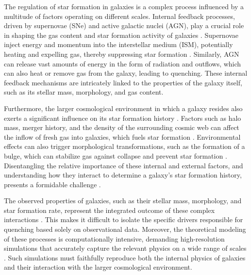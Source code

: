 \documentclass[twocolumn]{aastex631}
\begin{document}
The regulation of star formation in galaxies is a complex process influenced by a multitude of factors operating on different scales. Internal feedback processes, driven by supernovae (SNe) and active galactic nuclei (AGN), play a crucial role in shaping the gas content and star formation activity of galaxies \citep{hopkins2011selfregulatedstarformationgalaxies,carr2022regulationstarformationhot}. Supernovae inject energy and momentum into the interstellar medium (ISM), potentially heating and expelling gas, thereby suppressing star formation \citep{hopkins2011selfregulatedstarformationgalaxies,carr2022regulationstarformationhot}. Similarly, AGN can release vast amounts of energy in the form of radiation and outflows, which can also heat or remove gas from the galaxy, leading to quenching. These internal feedback mechanisms are intricately linked to the properties of the galaxy itself, such as its stellar mass, morphology, and gas content.

Furthermore, the larger cosmological environment in which a galaxy resides also exerts a significant influence on its star formation history \citep{wijesinghe2012galaxymassassemblygama,shi2023naturevsnurturerevisiting,pérezmillán2023relationmorphologystarformation}. Factors such as halo mass, merger history, and the density of the surrounding cosmic web can affect the inflow of fresh gas into galaxies, which fuels star formation \citep{wijesinghe2012galaxymassassemblygama,pérezmillán2023relationmorphologystarformation}. Environmental effects can also trigger morphological transformations, such as the formation of a bulge, which can stabilize gas against collapse and prevent star formation \citep{pérezmillán2023relationmorphologystarformation}. Disentangling the relative importance of these internal and external factors, and understanding how they interact to determine a galaxy's star formation history, presents a formidable challenge \citep{pérezmillán2023relationmorphologystarformation,mucesh2024natureversusnurturegalaxy}.

The observed properties of galaxies, such as their stellar mass, morphology, and star formation rate, represent the integrated outcome of these complex interactions  \citep{das2021galaxyinteractionsdifferentenvironments,li2024effectgalaxyinteractionsstarbursts}. This makes it difficult to isolate the specific drivers responsible for quenching based solely on observational data. Moreover, the theoretical modeling of these processes is computationally intensive, demanding high-resolution simulations that accurately capture the relevant physics on a wide range of scales  \citep{das2023galaxyinteractionsfilamentssheets,subramanian2023effectlowmassgalaxyinteractions}. Such simulations must faithfully reproduce both the internal physics of galaxies and their interaction with the larger cosmological environment.
\end{document}
